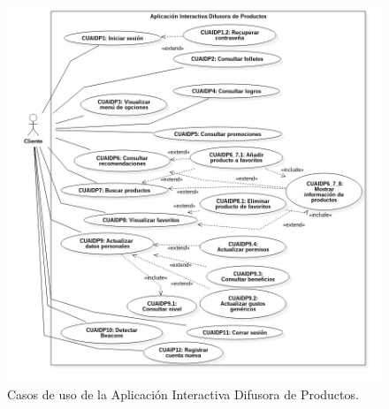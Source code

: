 \FloatBarrier
\begin{figure}[htbp!]
		\centering
			\includegraphics[width=1.1 \textwidth]{imagenes/Diagramas_UserApp/casosDeUso}
		\caption{Casos de uso de la Aplicación Interactiva Difusora de Productos.}
		\label{image:casosdeusoAIDP}
\end{figure}
\FloatBarrier

